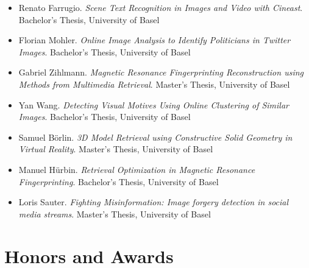 \begin{itemize}
	\item Renato Farrugio. \emph{Scene Text Recognition in Images and Video with Cineast}. Bachelor's Thesis, University of Basel
	\item Florian Mohler. \emph{Online Image Analysis to Identify Politicians in Twitter Images}. Bachelor's Thesis, University of Basel
	\item Gabriel Zihlmann. \emph{Magnetic Resonance Fingerprinting Reconstruction using Methods from Multimedia Retrieval}. Master's Thesis, University of Basel
	\item Yan Wang. \emph{Detecting Visual Motives Using Online Clustering of Similar Images}. Bachelor's Thesis, University of Basel
	\item Samuel Börlin. \emph{3D Model Retrieval using Constructive Solid Geometry in Virtual Reality}. Master's Thesis, University of Basel
	\item Manuel Hürbin. \emph{Retrieval Optimization in Magnetic Resonance Fingerprinting}. Bachelor's Thesis, University of Basel
	\item Loris Sauter. \emph{Fighting Misinformation: Image forgery detection in social media streams}. Master's Thesis, University of Basel
\end{itemize}

\section*{Honors and Awards}

